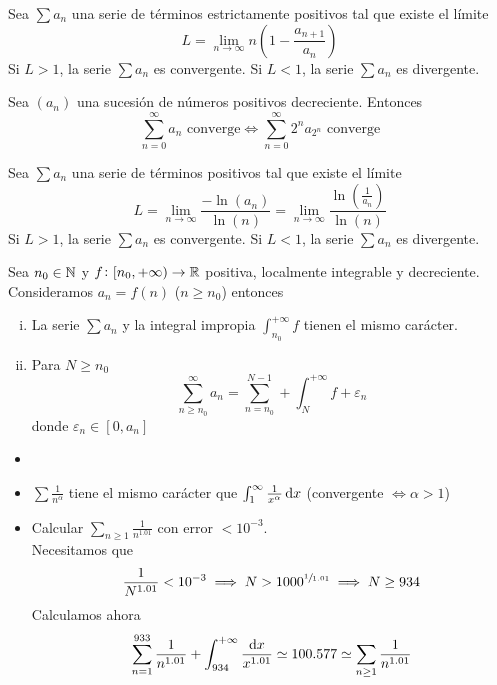 \begin{prop}
	Sea $\sum a_n$ una serie de términos estrictamente positivos tal que existe el límite
	\[
		L = \lim_{n \to \infty} n\left( 1 - \frac{a_{n+1}}{a_n} \right)
	\]
	Si $L > 1$, la serie $\sum a_n$ es convergente. Si $L < 1$, la serie $\sum a_n$ es
	divergente.
\end{prop}

\begin{prop*}%
	Sea $(a_n)$ una sucesión de números positivos decreciente. Entonces
	\[
		\sum_{n=0}^{\infty} a_n \text{ converge} \iff \sum_{n=0}^{\infty} 2^n a_{2^n}
		\text{ converge}
	\]
\end{prop*}

\begin{prop*}%
	Sea $\sum a_n$ una serie de términos positivos tal que existe el límite
	\[
		L = \lim_{n \to \infty} \frac{- \ln(a_n)}{\ln(n)} = \lim_{n \to \infty}
		\frac{\ln\left( \frac{1}{a_n} \right)}{\ln(n)}
	\]
	Si $L > 1$, la serie $\sum a_n$ es convergente. Si $L < 1$, la serie $\sum a_n$ es
	divergente.
\end{prop*}

\begin{prop}
	Sea $n_0 \in \mathbb{N}$ y $f \colon [n_0, +\infty) \to \mathbb{R}$ positiva, localmente integrable
	y decreciente. Consideramos $a_n = f(n)$ ($n \geq n_0$) entonces
	\begin{enumerate}[i)]
		\item La serie $\sum a_n$ y la integral impropia
		$\int_{n_0}^{+\infty} f$ tienen el mismo carácter.
		\item Para $N \geq n_0$
		\[
			\sum_{n \geq n_0}^{\infty} a_n = \sum_{n = n_0}^{N-1} + \int_{N}^{+\infty}f +
			\varepsilon_n
		\]
		donde $\varepsilon_n \in [0, a_n]$
	\end{enumerate}
\end{prop}

\begin{example*}
	\begin{itemize}
		\item[]
		\item $\sum \frac{1}{n^\alpha}$ tiene el mismo carácter que
			$\int_{1}^{\infty} \frac{1}{x^\alpha} \dif x$ (convergente $\iff \alpha > 1$)
		\item Calcular $\sum\limits_{n\geq 1} \frac{1}{n^{1.01}}$ con error $< 10^{-3}$. \\
			Necesitamos que
			\[
				\frac{1}{N^{1.01}} < 10^{-3} \implies N > 1000^{\sfrac{1}{1.01}} \implies
				N \geq 934
			\]
			Calculamos ahora
			\[
				\sum_{n=1}^{933} \frac{1}{n^{1.01}} + \int_{934}^{+\infty}
				\frac{\dif x}{x^{1.01}} \simeq 100.577 \simeq\sum_{n\geq 1}\frac{1}{n^{1.01}}
			\]
	\end{itemize}
\end{example*}

